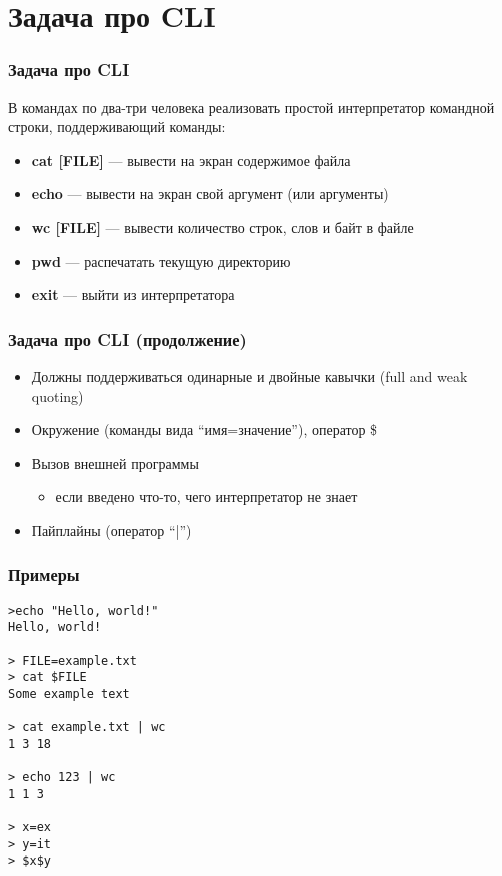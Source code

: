 \documentclass{../mcsslides}
\begin{document}
    
    \begin{frame}[plain]
        \titlepage
    \end{frame}

    \section{Задача про CLI}
    
    \begin{frame}
        \frametitle{Задача про CLI}
        В командах по два-три человека реализовать простой интерпретатор командной строки, поддерживающий команды:
        \begin{itemize}
            \item \textbf{cat [FILE]} --- вывести на экран содержимое файла
            \item \textbf{echo} --- вывести на экран свой аргумент (или аргументы)
            \item \textbf{wc [FILE]} --- вывести количество строк, слов и байт в файле
            \item \textbf{pwd} --- распечатать текущую директорию
            \item \textbf{exit} --- выйти из интерпретатора
        \end{itemize}
    \end{frame}
    
    \begin{frame}
        \frametitle{Задача про CLI (продолжение)}
        \begin{itemize}
            \item Должны поддерживаться одинарные и двойные кавычки (full and weak quoting)
            \item Окружение (команды вида ``имя=значение''), оператор \$
            \item Вызов внешней программы
            \begin{itemize}
                \item если введено что-то, чего интерпретатор не знает
            \end{itemize}
            \item Пайплайны (оператор ``|'')
        \end{itemize}
    \end{frame}
    
    \begin{frame}[fragile]
        \frametitle{Примеры}
        \begin{small}
            \begin{verbatim}
>echo "Hello, world!"
Hello, world!

> FILE=example.txt
> cat $FILE
Some example text

> cat example.txt | wc
1 3 18

> echo 123 | wc
1 1 3

> x=ex
> y=it
> $x$y
            \end{verbatim}
        \end{small}
    \end{frame}
\end{document}
